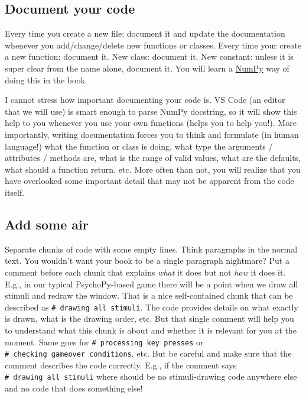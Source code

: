 \documentclass[
]{book}
\begin{document}
\hypertarget{document-your-code}{%
\subsection{Document your code}\label{document-your-code}}

Every time you create a new file: document it and update the documentation whenever you add/change/delete new functions or classes. Every time your create a new function: document it. New class: document it. New constant: unless it is super clear from the name alone, document it. You will learn a \href{https://numpydoc.readthedocs.io/en/latest/format.html}{NumPy} way of doing this in the book.

I cannot stress how important documenting your code is. VS Code (an editor that we will use) is smart enough to parse NumPy docstring, so it will show this help to you whenever you use your own functions (helps you to help you!). More importantly, writing documentation forces you to think and formulate (in human language!) what the function or class is doing, what type the arguments / attributes / methods are, what is the range of valid values, what are the defaults, what should a function return, etc. More often than not, you will realize that you have overlooked some important detail that may not be apparent from the code itself.

\hypertarget{add-some-air}{%
\subsection{Add some air}\label{add-some-air}}

Separate chunks of code with some empty lines. Think paragraphs in the normal text. You wouldn't want your book to be a single paragraph nightmare? Put a comment before each chunk that explains \emph{what} it does but not \emph{how} it does it. E.g., in our typical PsychoPy-based game there will be a point when we draw all stimuli and redraw the window. That is a nice self-contained chunk that can be described as \texttt{\#\ drawing\ all\ stimuli}. The code provides details on what exactly is drawn, what is the drawing order, etc. But that single comment will help you to understand what this chunk is about and whether it is relevant for you at the moment. Same goes for \texttt{\#\ processing\ key\ presses} or \texttt{\#\ checking\ gameover\ conditions}, etc. But be careful and make sure that the comment describes the code correctly. E.g., if the comment says \texttt{\#\ drawing\ all\ stimuli} where should be no stimuli-drawing code anywhere else and no code that does something else!
\end{document}
